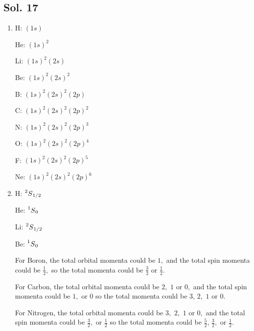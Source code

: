    \subsection*{Sol. 17}
   \begin{enumerate}
       \item 
       H: $(1s)$

   He: $(1s)^2$

   Li: $(1s)^2(2s)$

   Be: $(1s)^2(2s)^2$

   B: $(1s)^2(2s)^2(2p)$

   C: $(1s)^2(2s)^2(2p)^2$

   N: $(1s)^2(2s)^2(2p)^3$

   O: $(1s)^2(2s)^2(2p)^4$

   F: $(1s)^2(2s)^2(2p)^5$

   Ne: $(1s)^2(2s)^2(2p)^6$

   \item 

   H: $ \prescript{2}{}{S}_{1/2} $

   He: $ \prescript{1}{}{S}_{0} $

   Li: $ \prescript{2}{}{S}_{1/2} $

   Be: $ \prescript{1}{}{S}_{0} $

   For Boron, the total orbital momenta could be $1,$ and the total spin momenta could be $\frac{1}{2},$ so the total momenta could be $\frac{3}{2}$ or $\frac{1}{2}.$

   For Carbon, the total orbital momenta could be $2,$ $1$ or $0,$ and the total spin momenta could be $1,$ or $0$ so the total momenta could be $3$, $2,$ $1$ or $0.$

    For Nitrogen, the total orbital momenta could be $3,$ $2,$ $1$ or $0,$ and the total spin momenta could be $\frac{3}{2},$ or $\frac{1}{2}$ so the total momenta could be $\frac{5}{2}$, $\frac{3}{2},$ or $\frac{1}{2}.$
   
   \end{enumerate}

